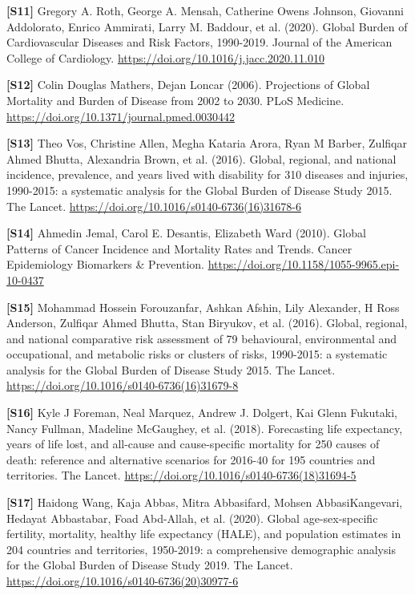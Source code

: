 \documentclass[10pt,a4paper]{article}
\begin{document}
\noindent\textbf{[S11]} Gregory A. Roth, George A. Mensah, Catherine Owens Johnson, Giovanni Addolorato, Enrico Ammirati, Larry M. Baddour, et al. (2020). Global Burden of Cardiovascular Diseases and Risk Factors, 1990-2019. Journal of the American College of Cardiology. \url{https://doi.org/10.1016/j.jacc.2020.11.010}\par

\noindent\textbf{[S12]} Colin Douglas Mathers, Dejan Loncar (2006). Projections of Global Mortality and Burden of Disease from 2002 to 2030. PLoS Medicine. \url{https://doi.org/10.1371/journal.pmed.0030442}\par

\noindent\textbf{[S13]} Theo Vos, Christine Allen, Megha Kataria Arora, Ryan M Barber, Zulfiqar Ahmed Bhutta, Alexandria Brown, et al. (2016). Global, regional, and national incidence, prevalence, and years lived with disability for 310 diseases and injuries, 1990-2015: a systematic analysis for the Global Burden of Disease Study 2015. The Lancet. \url{https://doi.org/10.1016/s0140-6736(16)31678-6}\par

\noindent\textbf{[S14]} Ahmedin Jemal, Carol E. Desantis, Elizabeth Ward (2010). Global Patterns of Cancer Incidence and Mortality Rates and Trends. Cancer Epidemiology Biomarkers \& Prevention. \url{https://doi.org/10.1158/1055-9965.epi-10-0437}\par

\noindent\textbf{[S15]} Mohammad Hossein Forouzanfar, Ashkan Afshin, Lily Alexander, H Ross Anderson, Zulfiqar Ahmed Bhutta, Stan Biryukov, et al. (2016). Global, regional, and national comparative risk assessment of 79 behavioural, environmental and occupational, and metabolic risks or clusters of risks, 1990-2015: a systematic analysis for the Global Burden of Disease Study 2015. The Lancet. \url{https://doi.org/10.1016/s0140-6736(16)31679-8}\par

\noindent\textbf{[S16]} Kyle J Foreman, Neal Marquez, Andrew J. Dolgert, Kai Glenn Fukutaki, Nancy Fullman, Madeline McGaughey, et al. (2018). Forecasting life expectancy, years of life lost, and all-cause and cause-specific mortality for 250 causes of death: reference and alternative scenarios for 2016-40 for 195 countries and territories. The Lancet. \url{https://doi.org/10.1016/s0140-6736(18)31694-5}\par

\noindent\textbf{[S17]} Haidong Wang, Kaja Abbas, Mitra Abbasifard, Mohsen AbbasiKangevari, Hedayat Abbastabar, Foad Abd-Allah, et al. (2020). Global age-sex-specific fertility, mortality, healthy life expectancy (HALE), and population estimates in 204 countries and territories, 1950-2019: a comprehensive demographic analysis for the Global Burden of Disease Study 2019. The Lancet. \url{https://doi.org/10.1016/s0140-6736(20)30977-6}\par
\end{document}
